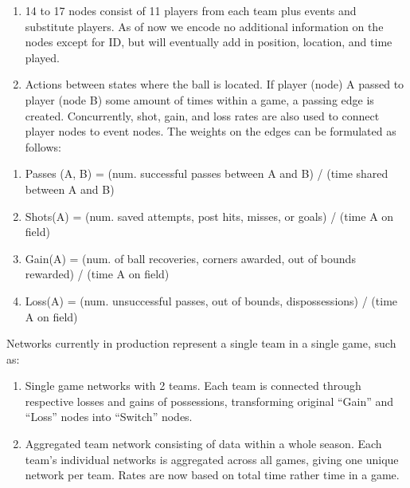 \begin{enumerate}

    \item {}  14 to 17 nodes consist of 11 players from each team plus events and substitute players. As of now we encode no additional information on the nodes except for ID, but will eventually add in position, location, and time played. 

    \item {} Actions between states where the ball is located. If player (node) A passed to player (node B) some amount of times within a game, a passing edge is created. Concurrently, shot, gain, and loss rates are also used to connect player nodes to event nodes. The weights on the edges can be formulated as follows: 

\end{enumerate}

\begin{enumerate}

    \item Passes (A, B) = (num. successful passes between A and B) / (time shared between A and B)

    \item Shots(A) = (num. saved attempts, post hits, misses, or goals) / (time A on field) 

    \item Gain(A) = (num. of ball recoveries, corners awarded, out of bounds rewarded) / (time A on field) 

    \item Loss(A) = (num. unsuccessful passes, out of bounds, dispossessions) / (time A on field) 

\end{enumerate}

Networks currently in production represent a single team in a single game, such as:

\begin{enumerate}
    \item Single game networks with 2 teams. Each team is connected through respective losses and gains of possessions, transforming original “Gain” and “Loss” nodes into “Switch” nodes.

    \item Aggregated team network consisting of data within a whole season. Each team’s individual networks is aggregated across all games, giving one unique network per team. Rates are now based on total time rather time in a game. 
\end{enumerate}




